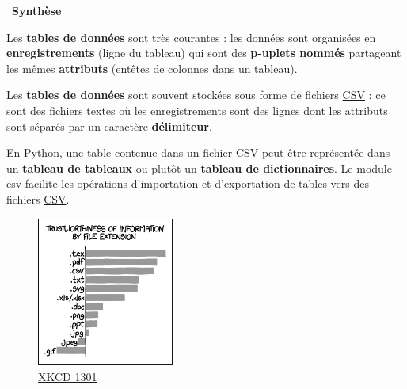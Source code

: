 \documentclass[
  11pt,
]{article}
\newenvironment{synthese}
{\par \medskip   \noindent   
\begin{bclogo}[arrondi =0.1,   noborder = true, logo=\bccle, marge=4]{~\textbf{Synthèse}   }  \par}
{
\end{bclogo}
 \par \bigskip }
\begin{document}
\begin{synthese}{}

Les \textbf{tables de données} sont très courantes : les données sont
organisées en \textbf{enregistrements} (ligne du tableau) qui sont des
\textbf{p-uplets nommés} partageant les mêmes \textbf{attributs}
(entêtes de colonnes dans un tableau).

Les \textbf{tables de données} sont souvent stockées sous forme de
fichiers
\href{https://fr.wikipedia.org/wiki/Comma-separated_values}{CSV} : ce
sont des fichiers textes où les enregistrements sont des lignes dont les
attributs sont séparés par un caractère \textbf{délimiteur}.

En Python, une table contenue dans un fichier
\href{https://fr.wikipedia.org/wiki/Comma-separated_values}{CSV} peut
être représentée dans un \textbf{tableau de tableaux} ou plutôt un
\textbf{tableau de dictionnaires}. Le
\href{https://docs.python.org/fr/3/library/csv.html}{module csv}
facilite les opérations d'importation et d'exportation de tables vers
des fichiers
\href{https://fr.wikipedia.org/wiki/Comma-separated_values}{CSV}.

\end{synthese}

\begin{figure}
\centering
\includegraphics[width=0.4\textwidth,height=\textheight]{images/file_extensions.png}
\caption{\href{https://www.explainxkcd.com/wiki/index.php/1301:_File_Extensions}{XKCD
1301}}
\end{figure}
\end{document}
